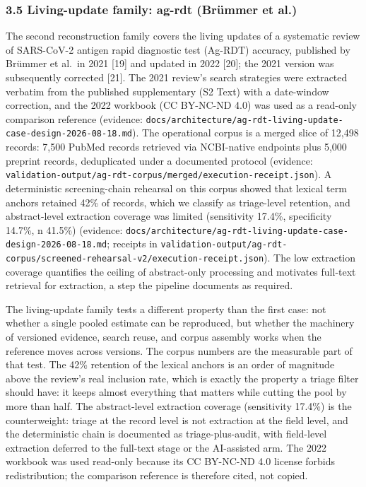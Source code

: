 \documentclass[
]{article}
\begin{document}
\subsubsection{3.5 Living-update family: ag-rdt (Brümmer et
al.)}\label{living-update-family-ag-rdt-bruxfcmmer-et-al.}

The second reconstruction family covers the living updates of a
systematic review of SARS-CoV-2 antigen rapid diagnostic test (Ag-RDT)
accuracy, published by Brümmer et al.~in 2021 {[}19{]} and updated in
2022 {[}20{]}; the 2021 version was subsequently corrected {[}21{]}. The
2021 review's search strategies were extracted verbatim from the
published supplementary (S2 Text) with a date-window correction, and the
2022 workbook (CC BY-NC-ND 4.0) was used as a read-only comparison
reference (evidence:
\texttt{docs/architecture/ag-rdt-living-update-case-design-2026-08-18.md}).
The operational corpus is a merged slice of 12,498 records: 7,500 PubMed
records retrieved via NCBI-native endpoints plus 5,000 preprint records,
deduplicated under a documented protocol (evidence:
\texttt{validation-output/ag-rdt-corpus/merged/execution-receipt.json}).
A deterministic screening-chain rehearsal on this corpus showed that
lexical term anchors retained 42\% of records, which we classify as
triage-level retention, and abstract-level extraction coverage was
limited (sensitivity 17.4\%, specificity 14.7\%, n 41.5\%) (evidence:
\texttt{docs/architecture/ag-rdt-living-update-case-design-2026-08-18.md};
receipts in
\texttt{validation-output/ag-rdt-corpus/screened-rehearsal-v2/execution-receipt.json}).
The low extraction coverage quantifies the ceiling of abstract-only
processing and motivates full-text retrieval for extraction, a step the
pipeline documents as required.

The living-update family tests a different property than the first case:
not whether a single pooled estimate can be reproduced, but whether the
machinery of versioned evidence, search reuse, and corpus assembly works
when the reference moves across versions. The corpus numbers are the
measurable part of that test. The 42\% retention of the lexical anchors
is an order of magnitude above the review's real inclusion rate, which
is exactly the property a triage filter should have: it keeps almost
everything that matters while cutting the pool by more than half. The
abstract-level extraction coverage (sensitivity 17.4\%) is the
counterweight: triage at the record level is not extraction at the field
level, and the deterministic chain is documented as triage-plus-audit,
with field-level extraction deferred to the full-text stage or the
AI-assisted arm. The 2022 workbook was used read-only because its CC
BY-NC-ND 4.0 license forbids redistribution; the comparison reference is
therefore cited, not copied.
\end{document}

